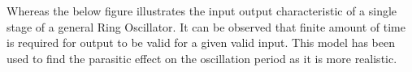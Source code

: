 \documentclass[a4paper,11pt]{article}%
\begin{document}
\begin{figure}[H]
	\centering
	\hfill
\end{figure}

Whereas the below figure illustrates the input output characteristic of a single stage of a general Ring Oscillator. It can be observed that finite amount of time is required for output to be valid for a given valid input. This model has  been used to find the parasitic effect on the oscillation period as it is more realistic.
\end{document}

